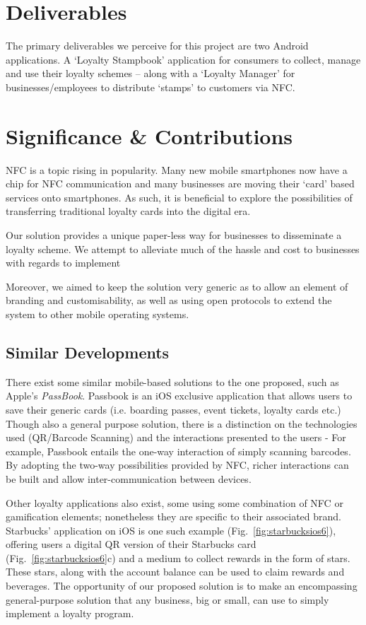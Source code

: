 \section{Deliverables}
The primary deliverables we perceive for this project are two Android applications. A `Loyalty Stampbook' application for consumers to collect, manage and use their loyalty schemes -- along with a `Loyalty Manager' for businesses/employees to distribute `stamps' to customers via NFC.  

\section{Significance \& Contributions}
NFC is a topic rising in popularity. Many new mobile smartphones now have a chip for NFC communication and many businesses are moving their `card' based services onto smartphones. As such, it is beneficial to explore the possibilities of transferring traditional loyalty cards into the digital era. 

Our solution provides a unique paper-less way for businesses to disseminate a loyalty scheme. We attempt to alleviate much of the hassle and cost to businesses with regards to implement

Moreover, we aimed to keep the solution very generic as to allow an element of branding and customisability, as well as using open protocols to extend the system to other mobile operating systems.   

\subsection{Similar Developments}
There exist some similar mobile-based solutions to the one proposed, such as Apple's \emph{PassBook}. Passbook is an iOS exclusive application that allows users to save their generic cards (i.e. boarding passes, event tickets, loyalty cards etc.) Though also a general purpose solution, there is a distinction on the technologies used (QR/Barcode Scanning) and the interactions presented to the users - For example, Passbook entails the one-way interaction of simply scanning barcodes. By adopting the two-way possibilities provided by NFC, richer interactions can be built and allow inter-communication between devices.

Other loyalty applications also exist, some using some combination of NFC or gamification elements; nonetheless they are specific to their associated brand. Starbucks' application on iOS is one such example (Fig.~\ref{fig:starbucksios6}), offering users a digital QR version of their Starbucks card (Fig.~\ref{fig:starbucksios6}c) and a medium to collect rewards in the form of stars. These stars, along with the account balance can be used to claim rewards and beverages. The opportunity of our proposed solution is to make an encompassing general-purpose solution that any business, big or small, can use to simply implement a loyalty program.

